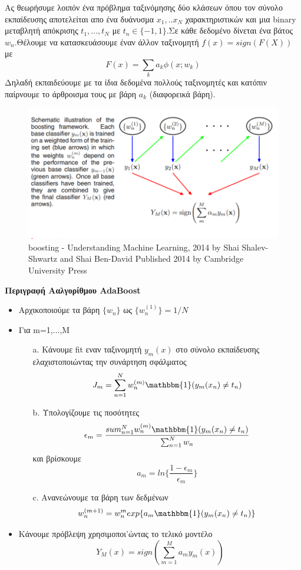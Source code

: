 \documentclass[12pt,a4paper]{article}
\begin{document}
\par Ας θεωρήσυμε λοιπόν ένα πρόβλημα ταξινόμησης δύο κλάσεων όπου τον σύνολο εκπαίδευσης αποτελείται απο ένα δυάνυσμα $x_1,..x_N$ χαρακτηριστικών και μια binary μεταβλητή απόκρισης $t_1,...,t_N$ με $t_n \in \{-1,1\}$.Σε κάθε  δεδομένο δίνεται ένα βάτος $w_n$.Θέλουμε να κατασκευάσουμε έναν άλλον ταξινομητή $f(x) = sign(F(X))$
με
$$F(x) = \sum_k a_k \phi(x;w_k)$$
Δηλαδή εκπαιδεύουμε με τα ίδια δεδομένα πολλούς ταξινομητές και κατόπιν παίρνουμε το άρθροισμα τους με βάρη $a_k$ (διαφορεικά βάρη).



\begin{figure}[H]
\centering
\includegraphics[width=0.90\linewidth,height=0.30\textheight]{Images/plot23}
\caption{boosting - Understanding Machine Learning,
 2014 by Shai Shalev-Shwartz and Shai Ben-David
Published 2014 by Cambridge University Press}
\label{fig:multi}
\end{figure}

\textbf{Περιγραφή Ααλγορίθμου AdaBoost}
\begin{itemize}
\item Αρχικοποιούμε τα βάρη $\{w_n\}$  ως $\{w_n^{(1)}\} =1/N $
\item Για m=1,...,M
\begin{itemize}
\item[a.] Κάνουμε fit εναν ταξινομητή $y_m(x) $ στο σύνολο εκπαίδευσης ελαχιστοποιώντας την συνάρτηση σφάλματος
$$J_m = \sum_{n=1}^N w_n^{(m)} \mathbbm{1}(y_m(x_n) \neq t_n)$$
\item[b.] Υπολογίζουμε τις ποσότητες
$$\epsilon_m = \frac{sum_{n=1}^N w_n^{(m)} \mathbbm{1}(y_m(x_n) \neq t_n)}{\sum_{n=1}^Nw_n}$$
και βρίσκουμε
$$a_m = ln\{\frac{1-\epsilon_m}{\epsilon_m}\}$$
\item[c.] Ανανεώνουμε τα βάρη των δεδμένων
$$w_n^{(m+1)} = w_n^mexp\{a_m\mathbbm{1}(y_m(x_n) \neq t_n)\} $$

\end{itemize}
\item Κάνουμε πρόβλεψη χρησιμοποι'ώντας το τελικό μοντέλο
$$Y_M(x) = sign(\sum_{m=1}^M a_m y_m(x))$$


\end{itemize}
\end{document}

